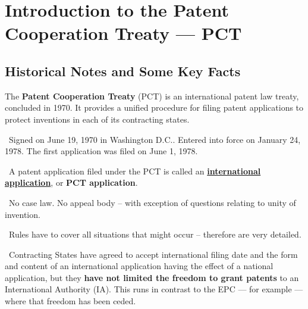 \documentclass{report}
\newcommand{\n}{\newline}
\newcommand{\p}{\adforn{61} \ }
\begin{document}
	
	\thispagestyle{empty}
	\newpage%
	\tableofcontents

\chapter{Introduction to the Patent Cooperation Treaty --- PCT}
\section{Historical Notes and Some Key Facts}

The \textbf{Patent Cooperation Treaty} (PCT) is an international patent law treaty, concluded in 1970. It provides a unified procedure for filing patent applications to protect inventions in each of its contracting states. \newline

\p   Signed on June 19, 1970 in Washington D.C.. Entered into force on January 24, 1978. The first application was filed on June 1, 1978.\newline

\p A patent application filed under the PCT is called an \underline{\textbf{international application}}, or \textbf{PCT application}. \n

\p No case law. No appeal body -- with exception of questions relating to unity of invention. \n

\p Rules have to cover all situations that might occur -- therefore are very detailed. \n

\p Contracting States have agreed to accept international filing date and the form and content of an international application having the effect of a national application, but they \textbf{have not limited the freedom to grant patents} to an International Authority (IA). This runs in contrast to the EPC --- for example --- where that freedom has been ceded.



\end{document}
